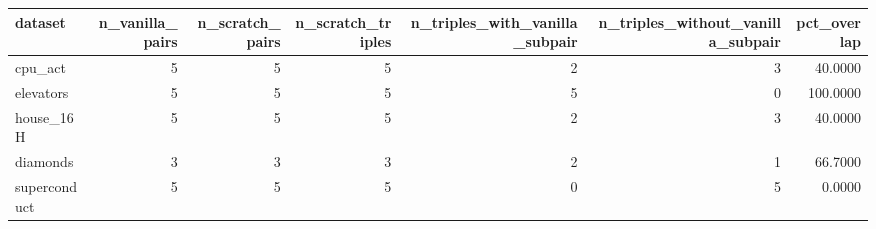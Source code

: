 \begin{tabular}{lrrrrrr}
\toprule
dataset & n_vanilla_pairs & n_scratch_pairs & n_scratch_triples & n_triples_with_vanilla_subpair & n_triples_without_vanilla_subpair & pct_overlap \\
\midrule
cpu_act & 5 & 5 & 5 & 2 & 3 & 40.0000 \\
elevators & 5 & 5 & 5 & 5 & 0 & 100.0000 \\
house_16H & 5 & 5 & 5 & 2 & 3 & 40.0000 \\
diamonds & 3 & 3 & 3 & 2 & 1 & 66.7000 \\
superconduct & 5 & 5 & 5 & 0 & 5 & 0.0000 \\
\bottomrule
\end{tabular}
